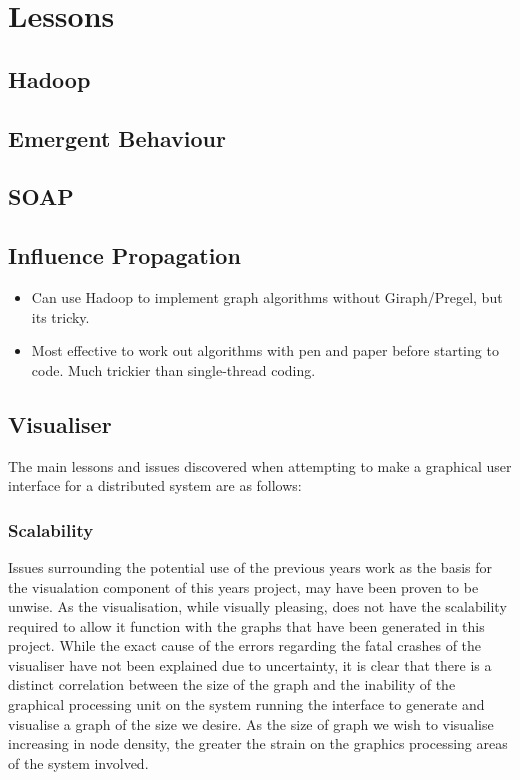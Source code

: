 \section{Lessons}


\subsection{Hadoop}

\subsection{Emergent Behaviour}

\subsection{SOAP}

\subsection{Influence Propagation}

\begin{itemize}
	\item Can use Hadoop to implement graph algorithms without Giraph/Pregel, but its tricky.
	\item Most effective to work out algorithms with pen and paper before starting to code. Much trickier than single-thread coding.
\end{itemize}

\subsection{Visualiser}

The main lessons and issues discovered when attempting to make a graphical user interface for a distributed system are as follows:

\subsubsection{Scalability}

Issues surrounding the potential use of the previous years work as the basis for the visualation component of this years project, may have been proven to be unwise. As the visualisation, while visually pleasing, does not have the scalability required to allow it function with the graphs that have been generated in this project. While the exact cause of the errors regarding the fatal crashes of the visualiser have not been explained due to uncertainty, it is clear that there is a distinct correlation between the size of the graph and the inability of the graphical processing unit on the system running the interface to generate and visualise a graph of the size we desire. As the size of graph we wish to visualise increasing in node density, the greater the strain on the graphics processing areas of the system involved. 

